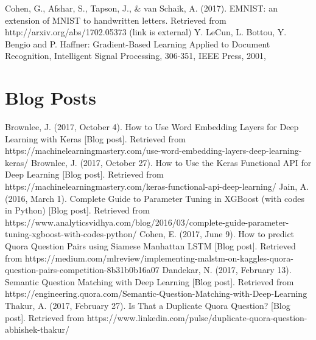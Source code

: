 \documentclass[letterpaper, 10 pt, conference]{ieeeconf}  %
\begin{document}
\pagebreak
\begin{thebibliography}{99}
 Cohen, G., Afshar, S., Tapson, J., \& van Schaik, A. (2017). EMNIST: an extension of MNIST to handwritten letters. Retrieved from http://arxiv.org/abs/1702.05373 (link is external)
 Y. LeCun, L. Bottou, Y. Bengio and P. Haffner: Gradient-Based Learning Applied to Document Recognition, Intelligent Signal Processing, 306-351, IEEE Press, 2001,


\section*{Blog Posts}

 Brownlee, J. (2017, October 4). How to Use Word Embedding Layers for Deep Learning with Keras [Blog post]. Retrieved from https://machinelearningmastery.com/use-word-embedding-layers-deep-learning-keras/
 Brownlee, J. (2017, October 27). How to Use the Keras Functional API for Deep Learning [Blog post]. Retrieved from https://machinelearningmastery.com/keras-functional-api-deep-learning/
 Jain, A. (2016, March 1). Complete Guide to Parameter Tuning in XGBoost (with codes in Python) [Blog post]. Retrieved from https://www.analyticsvidhya.com/blog/2016/03/complete-guide-parameter-tuning-xgboost-with-codes-python/
 Cohen, E. (2017, June 9). How to predict Quora Question Pairs using Siamese Manhattan LSTM [Blog post]. Retrieved from https://medium.com/mlreview/implementing-malstm-on-kaggles-quora-question-pairs-competition-8b31b0b16a07
 Dandekar, N. (2017, February 13). Semantic Question Matching with Deep Learning [Blog post]. Retrieved from https://engineering.quora.com/Semantic-Question-Matching-with-Deep-Learning
 Thakur, A. (2017, February 27). Is That a Duplicate Quora Question? [Blog post]. Retrieved from https://www.linkedin.com/pulse/duplicate-quora-question-abhishek-thakur/

\end{thebibliography}
\end{document}
